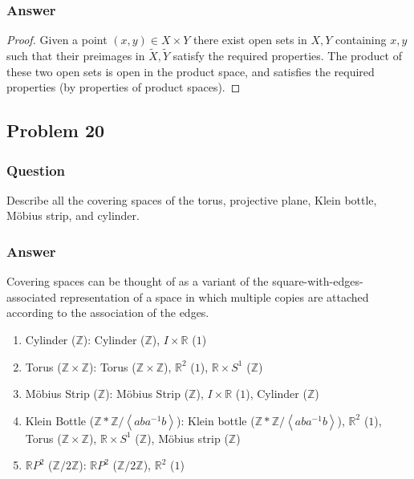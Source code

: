 \documentclass[10pt]{article}
\begin{document}
\subsubsection{Answer}
\begin{proof}
Given a point $(x,y) \in X \times Y$ there exist open sets in $X, Y$ containing $x, y$ such that their preimages in $\tilde{X}, \tilde{Y}$ satisfy the required properties. The product of these two open sets is open in the product space, and satisfies the required properties (by properties of product spaces).
\end{proof}


\subsection{Problem 20}
\subsubsection{Question}
Describe all the covering spaces of the torus, projective plane, Klein bottle, M\"{o}bius strip, and cylinder.
\subsubsection{Answer}
Covering spaces can be thought of as a variant of the square-with-edges-associated representation of a space in which multiple copies are attached according to the association of the edges.
\begin{enumerate}
\item Cylinder ($\mathbb{Z}$): Cylinder ($\mathbb{Z}$), $I \times \mathbb{R}$ ($1$)
\item Torus ($\mathbb{Z} \times \mathbb{Z}$): Torus ($\mathbb{Z} \times \mathbb{Z}$), $\mathbb{R}^2$ ($1$), $\mathbb{R} \times S^1$ ($\mathbb{Z}$)
\item M\"obius Strip ($\mathbb{Z}$):  M\"obius Strip ($\mathbb{Z}$), $I \times \mathbb{R}$ ($1$), Cylinder ($\mathbb{Z}$)
\item Klein Bottle ($\mathbb{Z} * \mathbb{Z } / \left< a b a^{-1} b \right>$): Klein bottle ($\mathbb{Z} * \mathbb{Z } / \left< a b a^{-1} b \right>$),  $\mathbb{R}^2$ ($1$), Torus ($\mathbb{Z} \times \mathbb{Z}$), $\mathbb{R} \times S^1$ ($\mathbb{Z}$), M\"obius strip ($\mathbb{Z}$)
\item $\mathbb{R}P^2$ ($\mathbb{Z}/2 \mathbb{Z}$): $\mathbb{R}P^2$ ($\mathbb{Z}/2 \mathbb{Z}$), $\mathbb{R}^2$ ($1$)
\end{enumerate}
\end{document}
